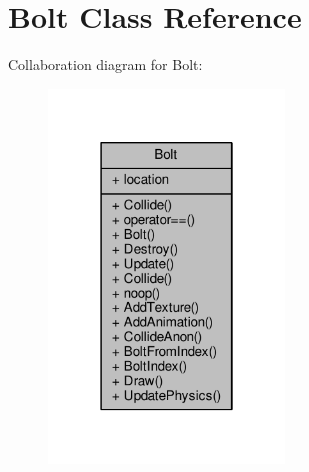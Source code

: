 \hypertarget{classBolt}{}\section{Bolt Class Reference}
\label{classBolt}


Collaboration diagram for Bolt\+:
\nopagebreak
\begin{figure}[H]
\begin{center}
\leavevmode
\includegraphics[width=178pt]{d1/dd1/classBolt__coll__graph}
\end{center}
\end{figure}
